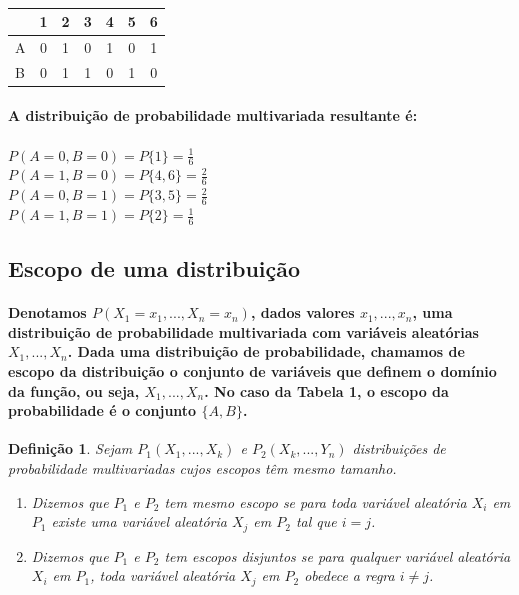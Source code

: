 \documentclass[a4paper,10pt]{article}
\theoremstyle{plain}
\newtheorem*{spn-def}{Definição}
\begin{document}
\begin{table}[h]
\caption{}
\begin{tabular}{l | *{6}{c}}
  & 1 & 2 & 3 & 4 & 5 & 6 \\
\hline
A & 0 & 1 & 0 & 1 & 0 & 1 \\
B & 0 & 1 & 1 & 0 & 1 & 0 \\
\end{tabular}
\end{table}

\paragraph{
  A distribuição de probabilidade multivariada resultante é:
}

\subparagraph{$P(A=0,B=0) = P\{1\} = \frac{1}{6}$ \\
  $P(A=1,B=0) = P\{4,6\} = \frac{2}{6}$ \\
  $P(A=0,B=1) = P\{3,5\} = \frac{2}{6}$ \\
  $P(A=1,B=1) = P\{2\} = \frac{1}{6}$
} 

\subsection{Escopo de uma distribuição}

\paragraph{
  Denotamos $P(X_1=x_1,...,X_n=x_n)$, dados valores $x_1,...,x_n$, uma distribuição de probabilidade multivariada
com variáveis aleatórias $X_1,...,X_n$. Dada uma distribuição de probabilidade, chamamos de escopo da distribuição 
o conjunto de variáveis que definem o domínio da função, ou seja, $X_1,...,X_n$. No caso da Tabela 1, o escopo da 
probabilidade é o conjunto $\{A, B\}$. 
}

\begin{spn-def} Sejam $P_1 (X_1,...,X_k)$ e $P_2 (X_k,...,Y_n)$ distribuições de probabilidade multivariadas cujos
  escopos têm mesmo tamanho.
\begin{enumerate} \itemsep0pt
  \item Dizemos que $P_1$ e $P_2$ tem mesmo escopo se para toda variável aleatória $X_i$ em $P_1$ existe uma
variável aleatória $X_j$ em $P_2$ tal que $i=j$.
  \item Dizemos que $P_1$ e $P_2$ tem escopos disjuntos se para qualquer variável aleatória $X_i$ em $P_1$,
toda variável aleatória $X_j$ em $P_2$ obedece a regra $i\neq{j}$. 
\end{enumerate}
\end{spn-def}
\end{document}
